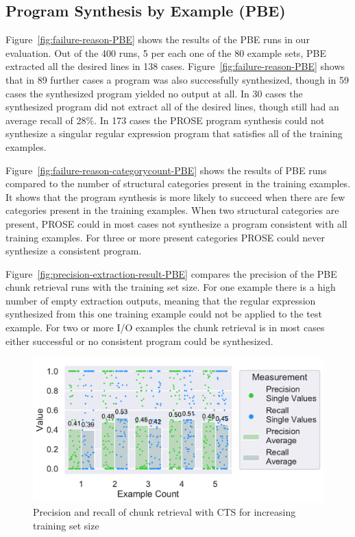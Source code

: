 \documentclass[\myrootdir/main.tex]{subfiles}
\begin{document}
\subsection{Program Synthesis by Example (PBE)}
Figure~\ref{fig:failure-reason-PBE} shows the results of the PBE runs in our evaluation.
Out of the 400 runs, 5 per each one of the 80 example sets, PBE extracted all the desired lines in 138 cases.
Figure~\ref{fig:failure-reason-PBE} shows that in 89 further cases a program was also successfully synthesized, though in 59 cases the synthesized program yielded no output at all.
In 30 cases the synthesized program did not extract all of the desired lines, though still had an average recall of 28\%.
In 173 cases the PROSE program synthesis could not synthesize a singular regular expression program that satisfies all of the training examples.

Figure~\ref{fig:failure-reason-categorycount-PBE} shows the results of PBE runs compared to the number of structural categories present in the training examples.
It shows that the program synthesis is more likely to succeed when there are few categories present in the training examples.
When two structural categories are present, PROSE could in most cases not synthesize a program consistent with all training examples.
For three or more present categories PROSE could never synthesize a consistent program.

Figure~\ref{fig:precision-extraction-result-PBE} compares the precision of the PBE chunk retrieval runs with the training set size.
For one example there is a high number of empty extraction outputs, meaning that the regular expression synthesized from this one training example could not be applied to the test example.
For two or more I/O examples the chunk retrieval is in most cases either successful or no consistent program could be synthesized.


\begin{figure}[htbp]
		\centering
		\includegraphics[width=\textwidth, clip]{img/big-study/recall-precision-examplecount-CTS.pdf}
		\caption{Precision and recall of chunk retrieval with CTS for increasing training set size}
		\label{fig:recall-precision-examplecount-CTS}
\end{figure}
\end{document}
